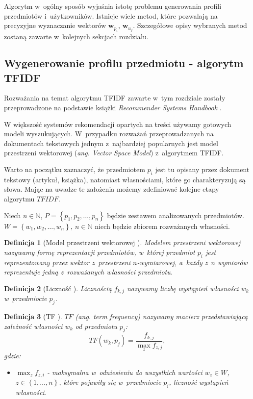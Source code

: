 \documentclass[12pt,a4paper]{report}
\newtheorem{df}{Definicja}[chapter]
\newcommand{\set}[1]{\left\lbrace {#1} \right\rbrace}
\newcommand{\setN}{\mathbb{N}}
\newcommand{\setPrzedmioty}{\mathit{P}}
\newcommand{\setWlasnosci}{\mathit{W}}
\begin{document}
Algorytm w~ogólny sposób wyjaśnia istotę problemu generowania profili przedmiotów i~użytkowników.
Istnieje wiele metod, które pozwalają na precyzyjne wyznaczanie wektorów $\mathbf{w}_{p_i}$, $\mathbf{w}_{u_j}$.
Szczegółowe opisy wybranych metod zostaną zawarte w~kolejnych sekcjach rozdziału.


\subsection{Wygenerowanie profilu przedmiotu - algorytm TFIDF}
Rozważania na temat algorytmu TFIDF zawarte w~tym rozdziale zostały przeprowadzone na podstawie książki \textit{Recommender Systems Handbook} {\citep[Sec 3.3.1.1]{rsh}}.
\bigskip
\bigskip

W większość systemów rekomendacji opartych na treści używamy gotowych modeli wyszukujących. W~przypadku rozważań przeprowadzanych na dokumentach tekstowych jednym z~najbardziej popularnych jest model przestrzeni wektorowej (\textit{ang. Vector Space Model}) z~algorytmem TFIDF. 

Warto na początku zaznaczyć, że przedmiotem $p_i$ jest tu opisany przez dokument tekstowy (artykuł, książka), natomiast własnościami, które go charakteryzują są słowa. Mając na uwadze te założenia możemy zdefiniować kolejne etapy algorytmu $TFIDF$.
\bigskip

Niech $n\in \setN$, $\setPrzedmioty = \set{p_1, p_2, \ldots ,p_n}$ będzie zestawem analizowanych przedmiotów. $W = \set{w_1, w_2, \ldots ,w_n}, \: n\in \setN $ niech będzie zbiorem rozważanych własności.

\begin{df}[Model przestrzeni wektorowej {\citep[Sec 3.3.1.1]{rsh}}]
Modelem przestrzeni wektorowej nazywamy formę reprezentacji przedmiotów, w~której przedmiot $p_i$ jest reprezentowany przez wektor z~przestrzeni $n$-wymiarowej, a~każdy z~$n$ wymiarów reprezentuje jedną z~rozważanych własności przedmiotu. 
\end{df}

\begin{df}[Liczność {\citep[Sec 3.3.1.1]{rsh}}]
Licznością $f_{k,j}$ nazywamy liczbę wystąpień własności $w_k$ w~przedmiocie $p_j$.
\end{df}

\begin{df}[TF {\citep[Sec 3.3.1.1]{rsh}}]
$TF$ (ang. \textit{term frequency}) nazywamy macierz przedstawiającą zależność własności $w_k$ od przedmiotu $p_j$:
$$
TF(w_k, p_j)=\frac{f_{k,j}}{\max_{z}f_{z,j}},
$$
gdzie:
\begin{itemize}
\item $\max_{z}f_{z,i}$ - maksymalna w~odniesieniu do wszystkich wartości $w_z \in \setWlasnosci$, $z \in \set{1, \ldots, n}$, które pojawiły się w~przedmiocie $p_i$, liczność wystąpień własności. 
\end{itemize}
\end{df}
\end{document}
